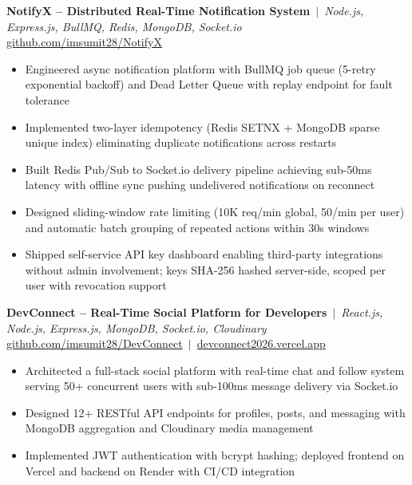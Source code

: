 \documentclass[10pt,letterpaper]{article}
\begin{document}
{\small\textbf{NotifyX -- Distributed Real-Time Notification System} \,$|$\, \textit{Node.js, Express.js, BullMQ, Redis, MongoDB, Socket.io}\\
\href{https://github.com/imsumit28/NotifyX}{github.com/imsumit28/NotifyX}}
\begin{itemize}
  \item {\small Engineered async notification platform with BullMQ job queue (5-retry exponential backoff) and Dead Letter Queue with replay endpoint for fault tolerance}
  \item {\small Implemented two-layer idempotency (Redis SETNX + MongoDB sparse unique index) eliminating duplicate notifications across restarts}
  \item {\small Built Redis Pub/Sub to Socket.io delivery pipeline achieving sub-50ms latency with offline sync pushing undelivered notifications on reconnect}
  \item {\small Designed sliding-window rate limiting (10K req/min global, 50/min per user) and automatic batch grouping of repeated actions within 30s windows}
  \item {\small Shipped self-service API key dashboard enabling third-party integrations without admin involvement; keys SHA-256 hashed server-side, scoped per user with revocation support}
\end{itemize}

\vspace{3pt}

{\small\textbf{DevConnect -- Real-Time Social Platform for Developers} \,$|$\, \textit{React.js, Node.js, Express.js, MongoDB, Socket.io, Cloudinary}\\
\href{https://github.com/imsumit28/DevConnect}{github.com/imsumit28/DevConnect} \,$|$\, \href{https://devconnect2026.vercel.app}{devconnect2026.vercel.app}}
\begin{itemize}
  \item {\small Architected a full-stack social platform with real-time chat and follow system serving 50+ concurrent users with sub-100ms message delivery via Socket.io}
  \item {\small Designed 12+ RESTful API endpoints for profiles, posts, and messaging with MongoDB aggregation and Cloudinary media management}
  \item {\small Implemented JWT authentication with bcrypt hashing; deployed frontend on Vercel and backend on Render with CI/CD integration}
\end{itemize}
\end{document}
